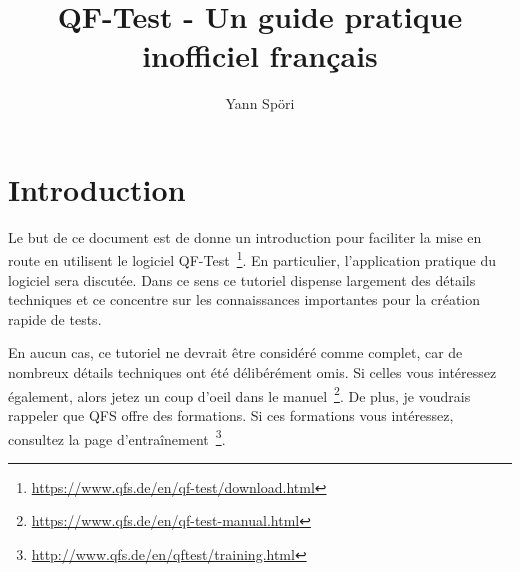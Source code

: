 \documentclass{article}
\begin{document}
\title{QF-Test - Un guide pratique inofficiel français}
\author{Yann Spöri}
\maketitle
\newpage

\tableofcontents
\newpage

\section{Introduction}
\par{
Le but de ce document est de donne un introduction pour faciliter la mise en route en utilisent le logiciel
QF-Test~\footnote{\url{https://www.qfs.de/en/qf-test/download.html}}. En particulier, l'application pratique
du logiciel sera discutée. Dans ce sens ce tutoriel dispense largement des détails techniques et ce concentre
sur les connaissances importantes pour la création rapide de tests.
}
\par{
En aucun cas, ce tutoriel ne devrait être considéré comme complet, car de nombreux détails techniques ont été
délibérément omis. Si celles vous intéressez également, alors jetez un coup d'oeil dans le
manuel~\footnote{\url{https://www.qfs.de/en/qf-test-manual.html}}. De plus, je voudrais rappeler que QFS
offre des formations. Si ces formations vous intéressez, consultez
la page d'entraînement~\footnote{\url{http://www.qfs.de/en/qftest/training.html}}.
}
\newpage
\end{document}
